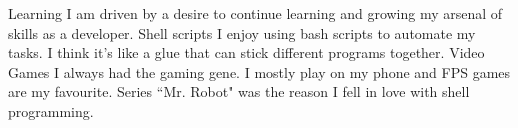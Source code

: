 



\begin{cvskills}

    \cvskill
    {Learning} %
    {I am driven by a desire to continue learning and growing my arsenal of skills as a developer.} %
  \cvskill
    {Shell scripts} %
    {I enjoy using bash scripts to automate my tasks. I think it's like a glue that can stick different programs together.} %
  \cvskill
    {Video Games} %
    {I always had the gaming gene. I mostly play on my phone and FPS games are my favourite.} %
  \cvskill
    {Series}
    {“Mr. Robot" was the reason I fell in love with shell programming.}
\end{cvskills}